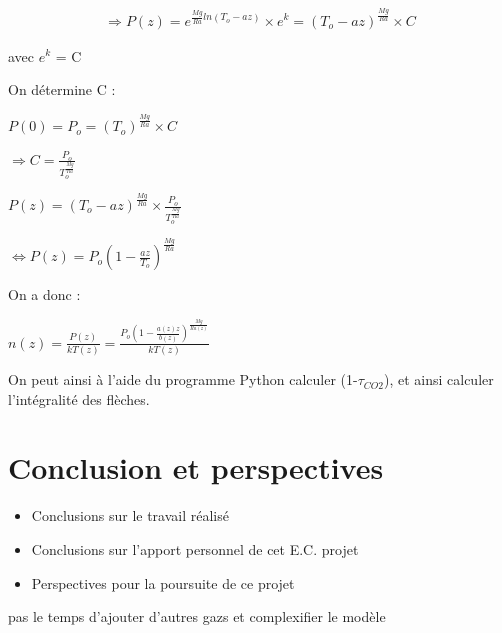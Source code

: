 \documentclass[a4paper, 12pt]{report} %
\begin{document}
\begin{align*}
     \Rightarrow P(z) = e^{\frac{Mg}{Ra}ln(T_o-az)} \times e^k =(T_o -az)^{\frac{Mg}{Ra}} \times C
\end{align*}

avec $e^{k}$ = C \vspace{\baselineskip}

On détermine C :
\begin{center}
$P(0)= P_o = (T_o)^{\frac{Mg}{Ra}} \times C$
\end{center}

\begin{center}
$\Rightarrow C= \frac{P_o}{T_o^{\frac{Mg}{Ra}}}$
\end{center}

\begin{center}
$P(z) = (T_o -az)^{\frac{Mg}{Ra}} \times \frac{P_o}{T_o^{\frac{Mg}{Ra}}}$
\end{center}

\begin{center}
$\Leftrightarrow P(z)= P_o (1-\frac{az}{T_o})^{\frac{Mg}{Ra}}$
\end{center}

On a donc :
\begin{center}
   $n(z)=\frac{P(z)}{kT(z)}= \frac{ P_o (1-\frac{a(z)z}{b(z)})^{\frac{Mg}{Ra(z)}}}{kT(z)}$
\end{center}

On peut ainsi à l'aide du programme Python calculer (1-$\tau_{CO2}$), et ainsi calculer l'intégralité des flèches.

\chapter*{Conclusion et perspectives}
\begin{itemize}
\item Conclusions sur le travail réalisé
\item Conclusions sur l'apport personnel de cet E.C. projet
\item Perspectives pour la poursuite de ce projet
\end{itemize}

\vspace{\baselineskip}
pas le temps d'ajouter d'autres gazs et complexifier le modèle


\newpage

\renewcommand{\notesname}{} %
\end{document}
